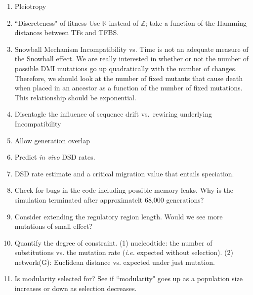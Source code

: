 \documentclass[a4paper, 11 pt]{article}
\begin{document}
\begin{enumerate}
  \item Pleiotropy

  \item ``Discreteness" of fitness
    Use $\mathbb{R}$ instead of $\mathbb{Z}$; take a function of the Hamming distances between TFs and TFBS.
  \item Snowball Mechanism
    Incompatibility vs. Time is not an adequate measure of the Snowball effect. We are really interested in whether or not the number of possible DMI mutations go up quadratically with the number of changes. Therefore, we should look at the number of fixed mutants that cause death when placed in an ancestor as a function of the number of fixed mutations. This relationship should be exponential.  
  \item Disentagle the influence of sequence drift vs.\ rewiring underlying Incompatibility
  \item Allow generation overlap
  \item Predict \emph{in vivo} DSD rates. 
  \item DSD rate estimate and a critical migration value that entails speciation.
  \item Check for bugs in the code including possible memory leaks. 
    Why is the simulation terminated after approximatelt 68,000 generations?
  \item Consider extending the regulatory region length. Would we see more mutations of small effect?
  \item Quantify the degree of constraint. (1) nucleodtide: the number of substitutions vs. the mutation rate (\emph{i.e.} expected without selection). (2) network(G): Euclidean distance vs. expected under just mutation. 
  \item Is modularity selected for? 
    See if ``modularity" goes up as a population size increases or down as selection decreases. 
\end{enumerate}
\end{document}
